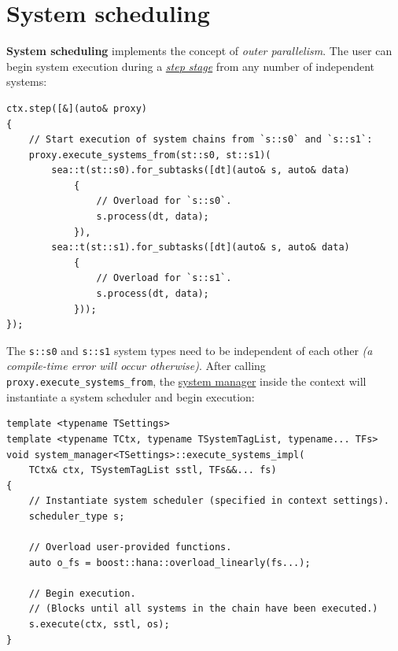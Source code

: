 \documentclass[twoside, 12pt, a4paper, openright]{book}
\begin{document}
\section{System scheduling}\label{system-scheduling}

\textbf{System scheduling} implements the concept of \emph{outer
parallelism}. The user can begin system execution during a
\protect\hyperlink{step_stage}{\emph{step stage}} from any number of
independent systems:

\begin{verbatim}
ctx.step([&](auto& proxy)
{
    // Start execution of system chains from `s::s0` and `s::s1`:
    proxy.execute_systems_from(st::s0, st::s1)(
        sea::t(st::s0).for_subtasks([dt](auto& s, auto& data)
            {
                // Overload for `s::s0`.
                s.process(dt, data);
            }),
        sea::t(st::s1).for_subtasks([dt](auto& s, auto& data)
            {
                // Overload for `s::s1`.
                s.process(dt, data);
            }));
});
\end{verbatim}

The
\texttt{s::s0}
and
\texttt{s::s1}
system types need to be independent of each other \emph{(a compile-time
error will occur otherwise)}. After calling
\texttt{proxy.execute_systems_from},
the \protect\hyperlink{architecture_system_mgr}{system manager} inside
the context will instantiate a system scheduler and begin execution:

\begin{verbatim}
template <typename TSettings>
template <typename TCtx, typename TSystemTagList, typename... TFs>
void system_manager<TSettings>::execute_systems_impl(
    TCtx& ctx, TSystemTagList sstl, TFs&&... fs)
{
    // Instantiate system scheduler (specified in context settings).
    scheduler_type s;

    // Overload user-provided functions.
    auto o_fs = boost::hana::overload_linearly(fs...);

    // Begin execution.
    // (Blocks until all systems in the chain have been executed.)
    s.execute(ctx, sstl, os);
}
\end{verbatim}
\end{document}
